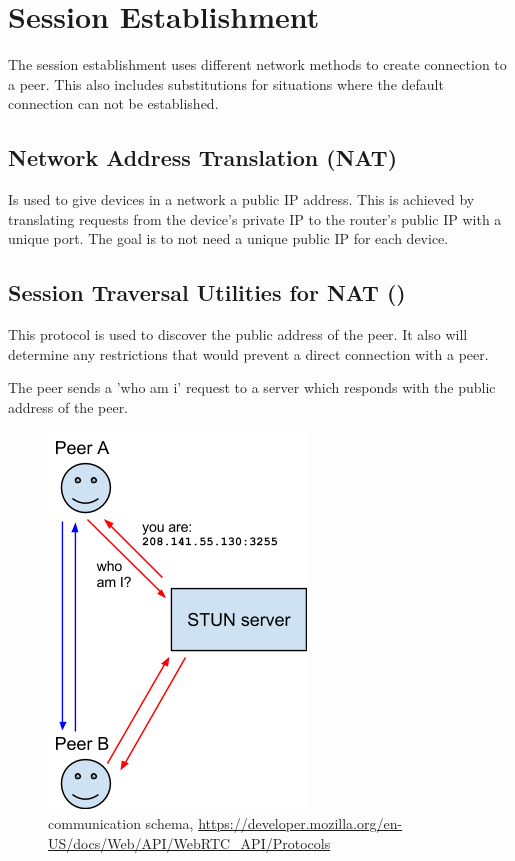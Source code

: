 
\section{Session Establishment}
The session establishment uses different network methods to create connection to a peer. This also includes substitutions for situations where the default connection can not be established.

\subsection{Network Address Translation (NAT)}
Is used to give devices in a network a public IP address. This is achieved by translating requests from the device's private IP to the router's public IP with a unique port. The goal is to not need a unique public IP for each device.

\subsection{Session Traversal Utilities for NAT ()}
This protocol is used to discover the public address of the peer. It also will determine any restrictions that would prevent a direct connection with a peer.

The peer sends a 'who am i' request to a  server which responds with the public address of the peer.

\begin{figure}[H]
	\includegraphics[scale=0.5]{images/webrtc-stun.png}
	\centering
	\caption{ communication schema, \url{https://developer.mozilla.org/en-US/docs/Web/API/WebRTC_API/Protocols}}
	\label{fig:stun}
\end{figure}

